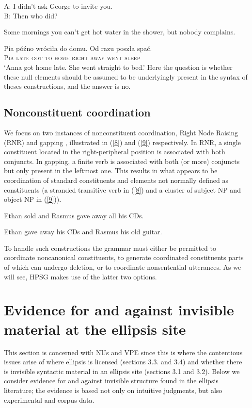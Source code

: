 \documentclass[output=paper
                ,modfonts
                ,nonflat
	        ,collection
	        ,collectionchapter
	        ,collectiontoclongg
 	        ,biblatex
                ,babelshorthands
                ,newtxmath
                ,draftmode
                ,colorlinks, citecolor=brown
]{./langsci/langscibook}
\begin{document}
{\ea A: I didn't ask George to invite you.\\B: Then who did?\label{5}\z

\ea Some mornings you can't get hot water in the shower, but nobody complains. \label{6} \z

\ea
\gll Pia p\'{o}\'{z}no wr\'{o}ci\l a do domu. {Od razu} posz\l a spa\'{c}.\\
\textsc{Pia} \textsc{late} \textsc{got} \textsc{to} \textsc{home} \textsc{right away} \textsc{went} \textsc{sleep}\\
\glt `Anna got home late. She went straight to bed.'
\label{7}
\z
Here the question is whether these null elements should be assumed to be underlyingly present in the syntax of theses constructions, and the answer is no.

\subsection{Nonconstituent coordination}

We focus on two instances of nonconstituent coordination, Right Node Raising (RNR) and gapping \citep{Ross1967}, illustrated in (\ref{8}) and (\ref{9}) respectively. In RNR, a single constituent located in the right-peripheral position is associated with both conjuncts. In gapping, a finite verb is associated with both (or more) conjuncts but only present in the leftmost one. This results in what appears to be coordination of standard constituents and elements not normally defined as constituents (a stranded transitive verb in (\ref{8}) and a cluster of subject NP and object NP in (\ref{9})).

\ea Ethan sold and Rasmus gave away all his CDs. \label{8}\z

\ea Ethan gave away his CDs and Rasmus his old guitar. \label{9}\z

To handle such constructions the grammar must either be permitted to coordinate noncanonical constituents, to generate coordinated constituents parts of which can undergo deletion, or to coordinate nonsentential utterances. As we will see, HPSG makes use of the latter two options.

\section{Evidence for and against invisible material at the ellipsis site}
This section is concerned with NUs and VPE since this is where the contentious issues arise of where ellipsis is licensed (sections 3.3. and 3.4) and whether there is invisible syntactic material in an ellipsis site (sections 3.1 and 3.2). Below we consider evidence for and against invisible structure found in the ellipsis literature; the evidence is based not only on intuitive judgments, but also experimental and corpus data.

}
\end{document}
